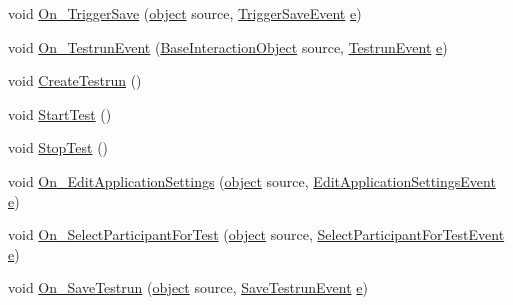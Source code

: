 \begin{DoxyCompactItemize}
\item 
void \hyperlink{class_web_analyzer_1_1_controller_1_1_main_controller_aadab56b24729cdfeeac6474825289c83}{On\+\_\+\+Trigger\+Save} (\hyperlink{_u_i_2_h_t_m_l_resources_2js_2lib_2underscore_8min_8js_aae18b7515bb2bc4137586506e7c0c903}{object} source, \hyperlink{class_web_analyzer_1_1_events_1_1_trigger_save_event}{Trigger\+Save\+Event} \hyperlink{_u_i_2_h_t_m_l_resources_2js_2lib_2bootstrap_8min_8js_ab5902775854a8b8440bcd25e0fe1c120}{e})
\item 
void \hyperlink{class_web_analyzer_1_1_controller_1_1_main_controller_a8f86c27064bd088e28cf0aa0308bda2b}{On\+\_\+\+Testrun\+Event} (\hyperlink{class_web_analyzer_1_1_u_i_1_1_interaction_objects_1_1_base_interaction_object}{Base\+Interaction\+Object} source, \hyperlink{class_web_analyzer_1_1_events_1_1_testrun_event}{Testrun\+Event} \hyperlink{_u_i_2_h_t_m_l_resources_2js_2lib_2bootstrap_8min_8js_ab5902775854a8b8440bcd25e0fe1c120}{e})
\item 
void \hyperlink{class_web_analyzer_1_1_controller_1_1_main_controller_a89558728bf22eec76ec4ff3ca0660490}{Create\+Testrun} ()
\item 
void \hyperlink{class_web_analyzer_1_1_controller_1_1_main_controller_a15dde2aa8b4f85e01fdfecf48483bbf8}{Start\+Test} ()
\item 
void \hyperlink{class_web_analyzer_1_1_controller_1_1_main_controller_ac75ad84f0191902e27a711efd325c648}{Stop\+Test} ()
\item 
void \hyperlink{class_web_analyzer_1_1_controller_1_1_main_controller_a0a28f10eb1aa2b814224a31a8a801054}{On\+\_\+\+Edit\+Application\+Settings} (\hyperlink{_u_i_2_h_t_m_l_resources_2js_2lib_2underscore_8min_8js_aae18b7515bb2bc4137586506e7c0c903}{object} source, \hyperlink{class_web_analyzer_1_1_events_1_1_edit_application_settings_event}{Edit\+Application\+Settings\+Event} \hyperlink{_u_i_2_h_t_m_l_resources_2js_2lib_2bootstrap_8min_8js_ab5902775854a8b8440bcd25e0fe1c120}{e})
\item 
void \hyperlink{class_web_analyzer_1_1_controller_1_1_main_controller_ae8eae4c1e6dda888f7231e39aaabba3c}{On\+\_\+\+Select\+Participant\+For\+Test} (\hyperlink{_u_i_2_h_t_m_l_resources_2js_2lib_2underscore_8min_8js_aae18b7515bb2bc4137586506e7c0c903}{object} source, \hyperlink{class_web_analyzer_1_1_events_1_1_select_participant_for_test_event}{Select\+Participant\+For\+Test\+Event} \hyperlink{_u_i_2_h_t_m_l_resources_2js_2lib_2bootstrap_8min_8js_ab5902775854a8b8440bcd25e0fe1c120}{e})
\item 
void \hyperlink{class_web_analyzer_1_1_controller_1_1_main_controller_aa00702c9b2f489d0db4a676f08e176aa}{On\+\_\+\+Save\+Testrun} (\hyperlink{_u_i_2_h_t_m_l_resources_2js_2lib_2underscore_8min_8js_aae18b7515bb2bc4137586506e7c0c903}{object} source, \hyperlink{class_web_analyzer_1_1_events_1_1_save_testrun_event}{Save\+Testrun\+Event} \hyperlink{_u_i_2_h_t_m_l_resources_2js_2lib_2bootstrap_8min_8js_ab5902775854a8b8440bcd25e0fe1c120}{e})

\end{DoxyCompactItemize}
